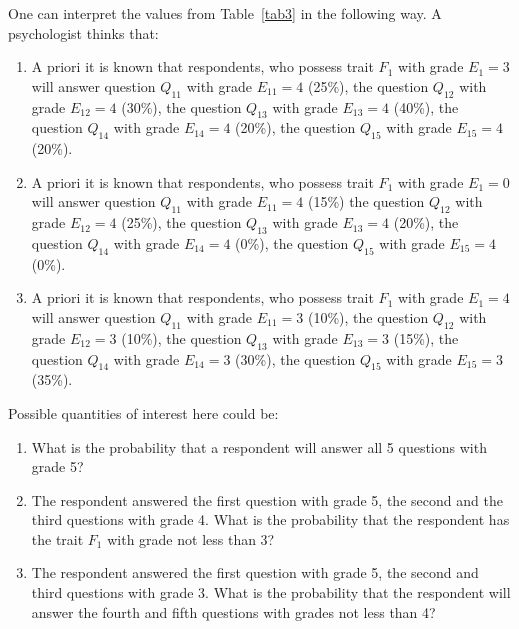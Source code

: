 \documentclass[12pt]{article}
\begin{document}
One can interpret the values from Table~\ref{tab3} in the following way.  A psychologist thinks that:
\begin{enumerate}
\item A priori it is known that respondents, who possess trait $F_1$ with grade $E_1=3$ will answer question $Q_{11}$ with grade $E_{11}=4$ (25\%), the question $Q_{12}$ with grade $E_{12}=4$ (30\%), the question $Q_{13}$ with grade $E_{13}=4$ (40\%), the question $Q_{14}$ with grade $E_{14}=4$  (20\%), the question $Q_{15}$ with grade $E_{15}=4$  (20\%).
\item A priori it is known that respondents, who possess trait $F_1$ with grade $E_1=0$ will answer question $Q_{11}$ with grade $E_{11}=4$ (15\%)
the question $Q_{12}$ with grade $E_{12}=4$ (25\%), the question $Q_{13}$ with grade $E_{13}=4$ (20\%), the question $Q_{14}$ with grade $E_{14}=4$ (0\%), the question $Q_{15}$ with grade $E_{15}=4$ (0\%). 
\item A priori it is known that respondents, who possess trait $F_1$ with grade $E_1=4$ will answer question $Q_{11}$ with grade $E_{11}=3$ (10\%), the question $Q_{12}$ with grade $E_{12}=3$ (10\%), the question $Q_{13}$ with grade $E_{13}=3$ (15\%), the question $Q_{14}$ with grade $E_{14}=3$ (30\%), the question $Q_{15}$ with grade $E_{15}=3$ (35\%). 
\end{enumerate}	

Possible quantities of interest here could be:
\begin{enumerate}
\item What is the probability that a respondent will answer all 5 questions with grade 5?
\item The respondent answered the first question with grade 5, the second and the third questions with grade 4. What is the probability that the respondent has the trait $F_1$ with grade not less than 3?
\item The respondent answered the first question with grade 5, the second and third questions with grade 3. What is the probability that the respondent will answer the fourth and fifth questions with grades not less than 4? 
\end{enumerate}	
\end{document}
